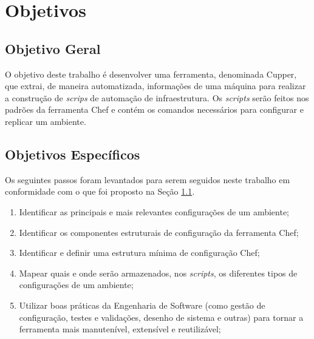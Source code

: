 \section{Objetivos}
\label{sec:obj}

\subsection{Objetivo Geral}
\label{sec:obj-grl}

O objetivo deste trabalho é desenvolver uma ferramenta, denominada Cupper,
que extrai, de maneira automatizada, informações de uma máquina para realizar
a construção de \textit{scrips} de automação de infraestrutura. Os \textit{scripts}
serão feitos nos padrões da ferramenta Chef e contém os comandos
necessários para configurar e replicar um ambiente.

\subsection{Objetivos Específicos}
\label{sec:obj-esp}

Os seguintes passos foram levantados para serem seguidos neste trabalho
em conformidade com o que foi proposto na Seção \ref{sec:obj-grl}.

\begin{enumerate}
  \item Identificar as principais e mais relevantes configurações de um ambiente;
  \item Identificar os componentes estruturais de configuração da ferramenta Chef;
  \item Identificar e definir uma estrutura mínima de configuração Chef;
  \item Mapear quais e onde serão armazenados, nos \textit{scripts}, os
    diferentes tipos de configurações de um ambiente;
  \item Utilizar boas práticas da Engenharia de Software (como gestão de configuração,
    testes e validações, desenho de sistema e outras) para tornar a ferramenta mais
    manutenível, extensível e reutilizável;
\end{enumerate}
